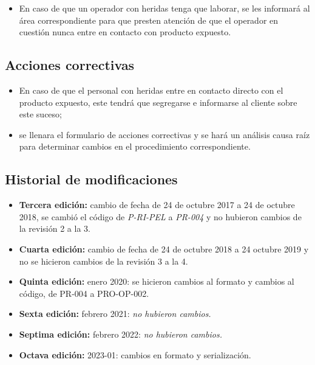 \begin{itemize}
	\item En caso de que un operador con heridas tenga que laborar, se les informará al área correspondiente para que presten atención de que el operador en cuestión nunca entre en contacto con producto expuesto.
\end{itemize}

\subsection{Acciones correctivas}

\begin{itemize}
	\item En caso de que el personal con heridas entre en contacto directo con el producto expuesto, este tendrá que segregarse e informarse al cliente sobre este suceso;
	\item se llenara el formulario de acciones correctivas y se hará un análisis causa raíz para determinar cambios en el procedimiento correspondiente.
\end{itemize}

\subsection{Historial de modificaciones}

\begin{itemize}
	\item \textbf{Tercera edición:} cambio de fecha de 24 de octubre 2017 a 24 de octubre 2018, se cambió el código de \emph{P-RI-PEL} a \emph{PR-004} y no hubieron cambios de la revisión 2 a la 3.
	\item \textbf{Cuarta edición:} cambio de fecha de 24 de octubre 2018 a 24 octubre 2019 y no se hicieron cambios de la revisión 3 a la 4.
	\item \textbf{Quinta edición:} enero 2020: se hicieron cambios al formato y cambios al código, de PR-004 a PRO-OP-002.
	\item \textbf{Sexta edición:} febrero 2021: \emph{no hubieron cambios.}
	\item \textbf{Septima edición:} febrero 2022: \emph{no hubieron cambios.}
	\item \textbf{Octava edición:} 2023-01: cambios en formato y serialización.
\end{itemize}

\pagestyle{formato}